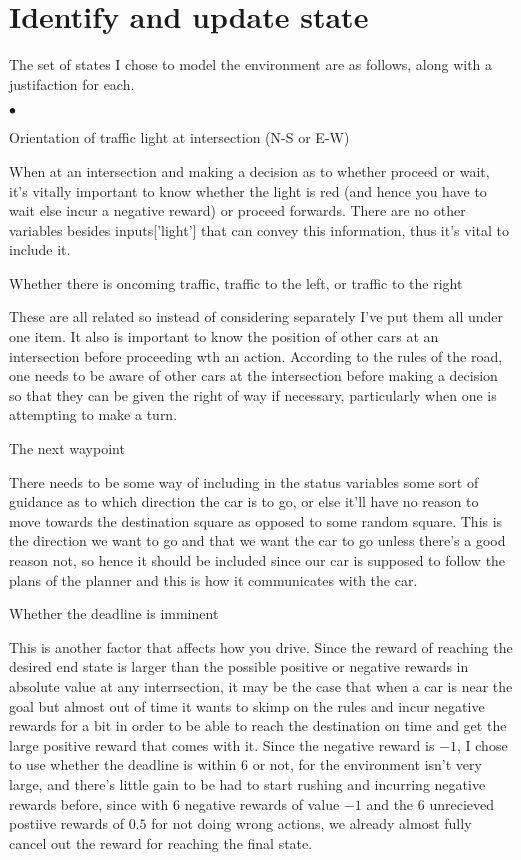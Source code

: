 \documentclass{amsart}
\begin{document}
\section{Identify and update state}
The set of states I chose to model the environment are as follows, along with a justifaction for each.
\begin{list}{$\bullet$}{\addtolength{\parsep}{1mm}}
	\item Orientation of traffic light at intersection (N-S or E-W)
	
	When at an intersection and making a decision as to whether proceed or wait, it's vitally important to know whether the light is red (and hence you have to wait else incur a negative reward) or proceed forwards.  There are no other variables besides inputs['light'] that can convey this information, thus it's vital to include it.

	\item Whether there is oncoming traffic, traffic to the left, or traffic to the right

	These are all related so instead of considering separately I've put them all under one item.  It also is important to know the position of other cars at an intersection before proceeding wth an action.  According to the rules of the road, one needs to be aware of other cars at the intersection before making a decision so that they can be given the right of way if necessary, particularly when one is attempting to make a turn.

	\item The next waypoint

	There needs to be some way of including in the status variables some sort of guidance as to which direction the car is to go, or else it'll have no reason to move towards the destination square as opposed to some random square.  This is the direction we want to go and that we want the car to go unless there's a good reason not, so hence it should be included since our car is supposed to follow the plans of the planner and this is how it communicates with the car.

	\item Whether the deadline is imminent
	
	This is another factor that affects how you drive.  Since the reward of reaching the desired end state is larger than the possible positive or negative rewards in absolute value at any interrsection, it may be the case that when a car is near the goal but almost out of time it wants to skimp on the rules and incur negative rewards for a bit in order to be able to reach the destination on time and get the large positive reward that comes with it.  Since the negative reward is $-1$, I chose to use whether the deadline is within 6 or not, for the environment isn't very large, and there's little gain to be had to start rushing and incurring negative rewards before, since with 6 negative rewards of value $-1$ and the 6 unrecieved postiive rewards of $0.5$ for not doing wrong actions, we already almost fully cancel out the reward for reaching the final state.
	

\end{list}
\end{document}
